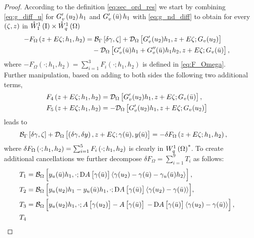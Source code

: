 \documentclass[final]{siamltex}
\begin{document}
\begin{proof}
	According to the definition \eqref{eq:sec_ord_res} we start by combining \eqref{eq:g_diff_u}  for $G_v'\del{u_2}h_1$ and $G_v'\del{\bar{u}} h_1$ with \eqref{eq:g_nd_diff} to obtain for every $\del{\zeta,z}$ in ${{\mathring{W}^{1}_{1}\del{{\text{\rm I}}}}} \times {{\mathring{W}^{1}_{q}\del{\Omega}}}$ 
	\begin{align*}
		-F_\Omega\del{z+E\zeta;h_1,h_2}
			&= {{\mathcal{B}}_\Gamma}\sbr{\delta\gamma, \zeta} 
				+ {{\mathcal{D}}_\Omega}\sbr{G_v'(u_2)h_1, z + E\zeta; G_v(u_2)}
			\\&\quad
				- {{\mathcal{D}}_\Omega}\sbr{G_v'({\bar{u}})h_1 + G_v''({\bar{u}})h_1h_2, z+ E\zeta; G_v({\bar{u}})},
	\end{align*}
	where $-F_\Omega(\cdot;h_1,h_2) = \sum_{i=1}^3 F_i(\cdot;h_1,h_2)$ is defined in \eqref{eq:F_Omega}. Further manipulation, based on adding to both sides the following two additional terms,
	\begin{align*}
		F_4\del{z + E\zeta;h_1,h_2} &=  {{\mathcal{D}}_\Omega}\sbr{G_v'(u_2)h_1, z + E\zeta; G_v({\bar{u}})}, \\
		F_5\del{z+ E\zeta;h_1,h_2} &= - {{\mathcal{D}}_\Omega}\sbr{G_v'(u_2)h_1, z + E\zeta; G_v(u_2)}
	\end{align*}
	leads to 
	\begin{align*}
		 {{\mathcal{B}}_\Gamma}\sbr{\delta\gamma, \zeta} + {{\mathcal{D}}_\Omega}\sbr{\del{\delta \gamma, \delta y},z + E\zeta;\gamma({\bar{u}}), y({\bar{u}})}& = -\delta F_\Omega\del{z+E\zeta;h_1,h_2},
	\end{align*}
where $\delta F_\Omega\del{\cdot;h_1,h_2} = \sum_{i=1}^5 F_i\del{\cdot;h_1,h_2}$ is clearly in ${{W^{1}_{q}\del{\Omega}}}^*$. To create additional cancellations we further decompose $\delta F_\Omega = \sum_{i=1}^{9} T_i$ as follows:
	\begin{align*}
		T_1 
			&= {{\mathcal{B}}_\Omega}\sbr{y_u({\bar{u}})h_1,\cdot;
					\Dif A\sbr{\gamma({\bar{u}})}{\langle {\gamma(u_2)-\gamma({\bar{u}}) - 					\gamma_u({\bar{u}})h_2} \rangle} }, \\
		T_2 
			&= {{{\mathcal{B}}_\Omega}\sbr{y_u(u_2)h_1-y_u({\bar{u}})h_1,\cdot;
					\Dif A\sbr{\gamma({\bar{u}})}{\langle {\gamma(u_2)-\gamma({\bar{u}})} \rangle} }}, \\
		T_3 
			&= {{\mathcal{B}}_\Omega}\left[{ y_u(u_2)h_1,\cdot;
						A\sbr{\gamma(u_2)} - A\sbr{\gamma({\bar{u}})} 
					}\right.  \left.{
						-\Dif A\sbr{\gamma({\bar{u}})}{\langle {\gamma(u_2)-\gamma({\bar{u}})} \rangle} 
					}\right], \\
		T_4 

\end{align*}
\end{proof}
\end{document}
